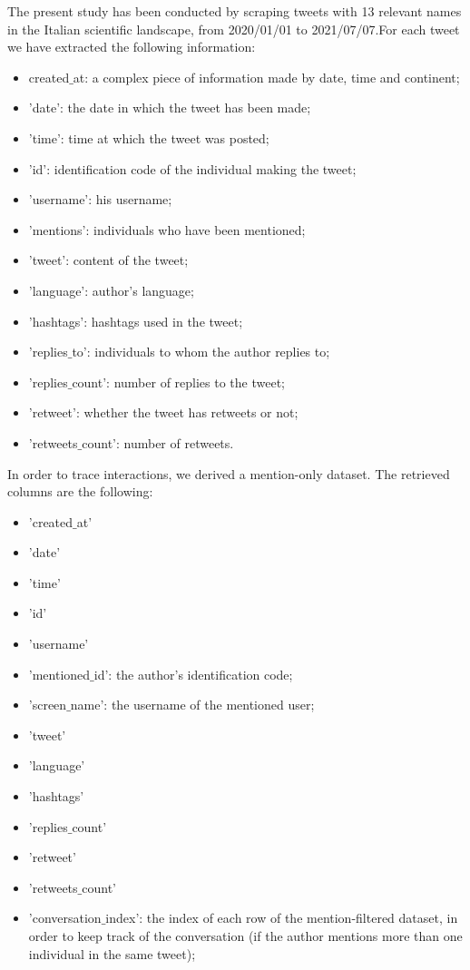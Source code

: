 \documentclass[sigchi]{acmart}
\begin{document}
The present study has been conducted by scraping tweets with 13 relevant names in the Italian scientific landscape, from 2020/01/01 to 2021/07/07.For each tweet we have extracted the following information:
\begin{itemize}
    \item created$\_$at: a complex piece of information made by date, time and continent;
    \item 'date': the date in which the tweet has been made;
    \item 'time': time at which the tweet was posted;
    \item 'id': identification code of the individual making the tweet;
    \item 'username': his username;
    \item 'mentions': individuals who have been mentioned;
    \item 'tweet': content of the tweet;
    \item 'language': author's language;
    \item 'hashtags': hashtags used in the tweet;
    \item 'replies$\_$to': individuals to whom the author replies to;
    \item 'replies$\_$count': number of replies to the tweet;
    \item 'retweet': whether the tweet has retweets or not;
    \item 'retweets$\_$count': number of retweets.
\end{itemize}

In order to trace interactions, we derived a mention-only dataset. The retrieved columns are the following:
\begin{itemize}
    \item 'created$\_$at'
    \item 'date'
    \item 'time'
    \item 'id'
    \item 'username'
    \item 'mentioned$\_$id': the author's identification code;
    \item 'screen$\_$name': the username of the mentioned user;
    \item 'tweet'
    \item 'language'
    \item 'hashtags'
    \item 'replies$\_$count'
    \item 'retweet'
    \item 'retweets$\_$count'
    \item 'conversation$\_$index': the index of each row of the mention-filtered dataset, in order to keep track of the conversation (if the author mentions more than one individual in the same tweet);
\end{itemize}
\end{document}
